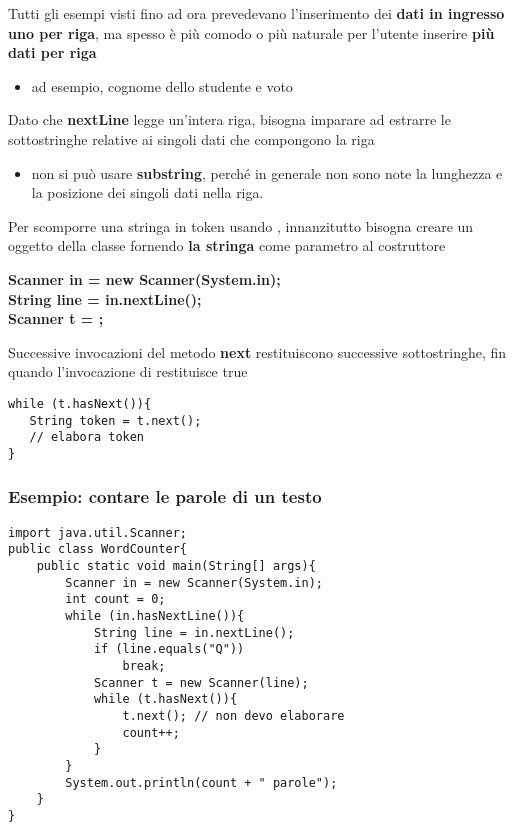 \begin{frame}
\begin{block}{}
Tutti gli esempi visti fino ad ora prevedevano l'inserimento dei \textbf{dati in ingresso uno per riga}, ma spesso è più comodo o più 
naturale per l'utente inserire \textbf{più dati per riga}
\begin{itemize}
\item ad esempio, cognome dello studente e voto
\end{itemize}
\end{block}
\begin{block}{}
Dato che \textbf{\alert{nextLine}} legge un'intera riga, bisogna imparare ad estrarre le sottostringhe relative ai singoli
dati che compongono la riga
\begin{itemize}
\item non si può usare \textbf{\alert{substring}}, perché in generale non sono note la lunghezza e la posizione dei singoli 
dati nella riga.
\end{itemize}
\end{block}
\end{frame}

\begin{frame}[fragile]
\begin{block}{}
Per scomporre una stringa in token usando \textbf{}, innanzitutto bisogna creare un oggetto della classe
fornendo \textbf{\alert{la stringa}} come parametro al costruttore
\end{block}
\hspace{0.9cm}\textbf{Scanner in = new Scanner(System.in);}\\
\hspace{0.9cm}\textbf{String line = in.nextLine();}\\
\hspace{0.9cm}\textbf{Scanner t = ;}
\begin{block}{}
Successive invocazioni del metodo \textbf{\alert{next}} restituiscono successive sottostringhe, fin quando l'invocazione di
\textbf{} restituisce true
\end{block}
\begin{lstlisting}
while (t.hasNext()){ 
   String token = t.next();
   // elabora token
}
\end{lstlisting}
\end{frame}

\begin{frame}[fragile]
\frametitle{Esempio: contare le parole di un testo}
\begin{lstlisting}
import java.util.Scanner;
public class WordCounter{
    public static void main(String[] args){
        Scanner in = new Scanner(System.in);
        int count = 0;
        while (in.hasNextLine()){
        	String line = in.nextLine();
        	if (line.equals("Q"))
				break;
        	Scanner t = new Scanner(line);
            while (t.hasNext()){
                t.next(); // non devo elaborare
                count++;
            }
        }
        System.out.println(count + " parole");
    }
}
\end{lstlisting}
\end{frame}

